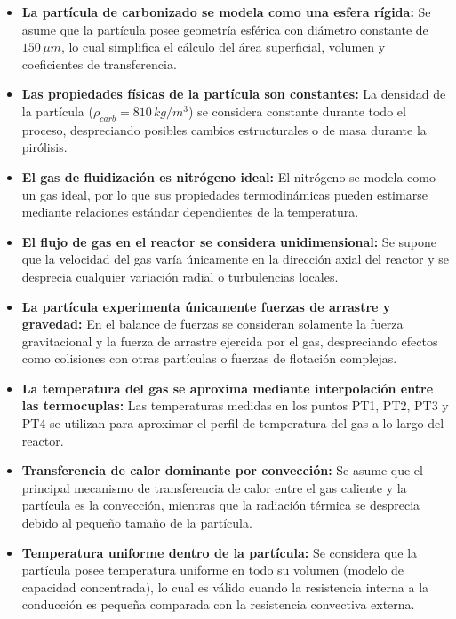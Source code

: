 \documentclass[11pt,stdletter,orderfromtodate,sigleft,twoside]{report}
\begin{document}
\begin{itemize}

\item \textbf{La partícula de carbonizado se modela como una esfera rígida:}  
Se asume que la partícula posee geometría esférica con diámetro constante de $150\,\mu m$, lo cual simplifica el cálculo del área superficial, volumen y coeficientes de transferencia.

\item \textbf{Las propiedades físicas de la partícula son constantes:}  
La densidad de la partícula ($\rho_{carb} = 810\,kg/m^3$) se considera constante durante todo el proceso, despreciando posibles cambios estructurales o de masa durante la pirólisis.

\item \textbf{El gas de fluidización es nitrógeno ideal:}  
El nitrógeno se modela como un gas ideal, por lo que sus propiedades termodinámicas pueden estimarse mediante relaciones estándar dependientes de la temperatura.

\item \textbf{El flujo de gas en el reactor se considera unidimensional:}  
Se supone que la velocidad del gas varía únicamente en la dirección axial del reactor y se desprecia cualquier variación radial o turbulencias locales.

\item \textbf{La partícula experimenta únicamente fuerzas de arrastre y gravedad:}  
En el balance de fuerzas se consideran solamente la fuerza gravitacional y la fuerza de arrastre ejercida por el gas, despreciando efectos como colisiones con otras partículas o fuerzas de flotación complejas.

\item \textbf{La temperatura del gas se aproxima mediante interpolación entre las termocuplas:}  
Las temperaturas medidas en los puntos PT1, PT2, PT3 y PT4 se utilizan para aproximar el perfil de temperatura del gas a lo largo del reactor.

\item \textbf{Transferencia de calor dominante por convección:}  
Se asume que el principal mecanismo de transferencia de calor entre el gas caliente y la partícula es la convección, mientras que la radiación térmica se desprecia debido al pequeño tamaño de la partícula.

\item \textbf{Temperatura uniforme dentro de la partícula:}  
Se considera que la partícula posee temperatura uniforme en todo su volumen (modelo de capacidad concentrada), lo cual es válido cuando la resistencia interna a la conducción es pequeña comparada con la resistencia convectiva externa.


\end{itemize}
\end{document}
